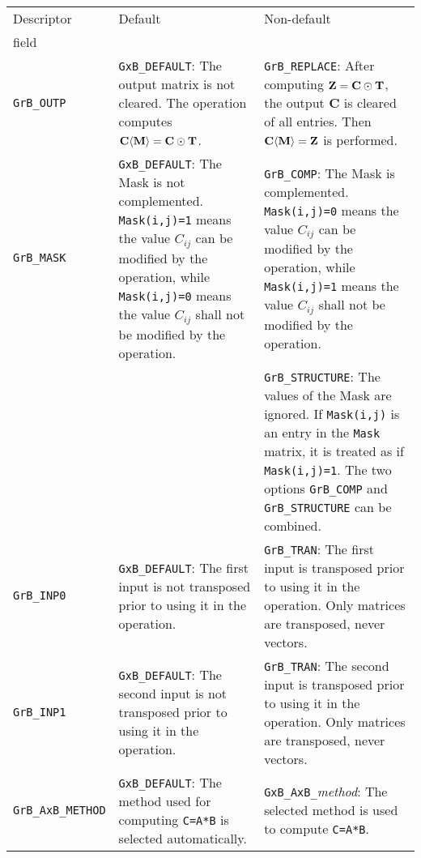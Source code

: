 \documentclass[12pt]{article}
\begin{document}
\vspace{0.2in}
\noindent
{\small
\begin{tabular}{|l|p{2.4in}|p{2.2in}|}
\hline
Descriptor & Default   & Non-default \\
field      & &  \\
\hline

\verb'GrB_OUTP'
    & \verb'GxB_DEFAULT':
    The output matrix is not cleared.  The operation computes
    ${\bf C \langle M \rangle = C \odot T}$.
    & \verb'GrB_REPLACE':
    After computing ${\bf Z=C\odot T}$,
    the output {\bf C} is cleared of all entries.
    Then ${\bf C \langle M \rangle = Z}$ is performed. \\

\hline

\verb'GrB_MASK'
    & \verb'GxB_DEFAULT':
    The Mask is not complemented.  \verb'Mask(i,j)=1' means the value $C_{ij}$
    can be modified by the operation, while \verb'Mask(i,j)=0' means the value
    $C_{ij}$ shall not be modified by the operation.
    & \verb'GrB_COMP':
    The Mask is complemented.  \verb'Mask(i,j)=0' means the value $C_{ij}$
    can be modified by the operation, while \verb'Mask(i,j)=1' means the value
    $C_{ij}$ shall not be modified by the operation. \\
    &
    & \verb'GrB_STRUCTURE':
    The values of the Mask are ignored.  If \verb'Mask(i,j)' is an entry
    in the \verb'Mask' matrix, it is treated as if \verb'Mask(i,j)=1'.
    The two options \verb'GrB_COMP' and \verb'GrB_STRUCTURE' can be
    combined.  \\

\hline

\verb'GrB_INP0'
    & \verb'GxB_DEFAULT':
    The first input is not transposed prior to using it in the operation.
    & \verb'GrB_TRAN':
    The first input is transposed prior to using it in the operation.  Only
    matrices are transposed, never vectors. \\

\hline

\verb'GrB_INP1'
    & \verb'GxB_DEFAULT':
    The second input is not transposed prior to using it in the operation.
    & \verb'GrB_TRAN':
    The second input is transposed prior to using it in the operation.  Only
    matrices are transposed, never vectors. \\

\hline

\verb'GrB_AxB_METHOD'
    & \verb'GxB_DEFAULT':
    The method used for computing \verb'C=A*B' is selected automatically.
    & \verb'GxB_AxB_'{\em method}: The selected method is used to compute
    \verb'C=A*B'.  \\

\hline
\end{tabular}
}
\end{document}
